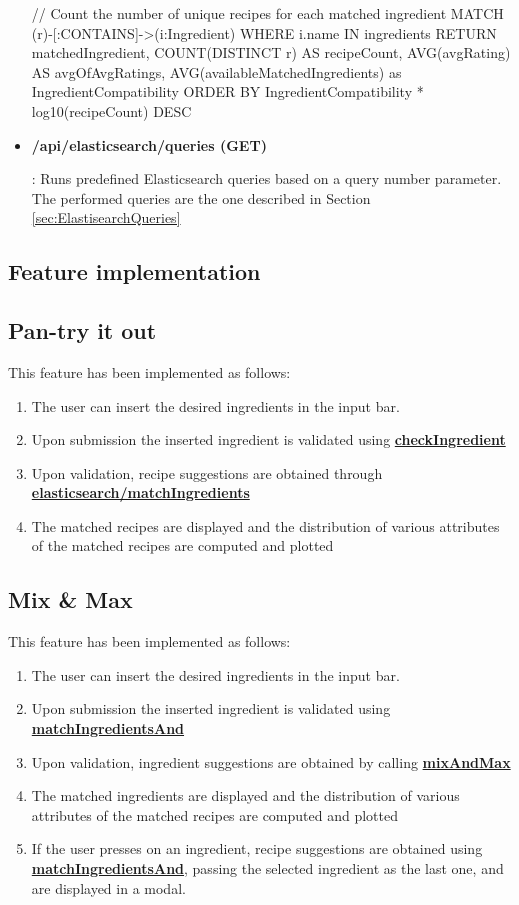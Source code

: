 \begin{itemize}
\begin{CypherQuery}
// Count the number of unique recipes for each matched ingredient
MATCH (r)-[:CONTAINS]->(i:Ingredient)
WHERE i.name IN ingredients
RETURN matchedIngredient, COUNT(DISTINCT r) AS recipeCount, AVG(avgRating) AS avgOfAvgRatings, AVG(availableMatchedIngredients) as IngredientCompatibility
ORDER BY IngredientCompatibility * log10(recipeCount) DESC
\end{CypherQuery}
\item \hypertarget{elasticsearch/queries}{\textbf{/api/elasticsearch/queries (GET)}}: Runs predefined Elasticsearch queries based on a query number parameter. The performed queries are the one described in Section \ref{sec:ElastisearchQueries}
\end{itemize}

\subsection{Feature implementation}
\subsection*{Pan-try it out}
This feature has been implemented as follows:
\newcommand{\hyperLinkToAPI}[1]{\hyperlink{fun:#1}{\textbf{#1}}}
\begin{enumerate}
    \item The user can insert the desired ingredients in the input bar.
    \item Upon submission the inserted ingredient is validated using \hyperLinkToAPI{checkIngredient}
    \item Upon validation, recipe suggestions are obtained through \hyperLinkToAPI{elasticsearch/matchIngredients}
    \item The matched recipes are displayed and the distribution of various attributes of the matched recipes are computed and plotted
\end{enumerate}

\subsection*{Mix \& Max}
This feature has been implemented as follows:

\begin{enumerate}
    \item The user can insert the desired ingredients in the input bar.
    \item Upon submission the inserted ingredient is validated using \hyperLinkToAPI{matchIngredientsAnd}
    \item Upon validation, ingredient suggestions are obtained by calling  \hyperLinkToAPI{mixAndMax}
    \item The matched ingredients are displayed and the distribution of various attributes of the matched recipes are computed and plotted
    \item If the user presses on an ingredient, recipe suggestions are obtained using \hyperLinkToAPI{matchIngredientsAnd}, passing the selected ingredient as the last one,
    and are displayed in a modal.
\end{enumerate}

